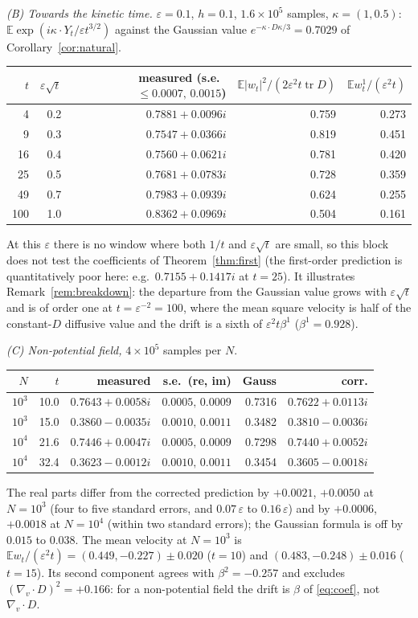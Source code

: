 \documentclass[11pt]{article}
\newcommand{\E}{\mathbb{E}}
\newcommand{\eps}{\varepsilon}
\newcommand{\tr}{\operatorname{tr}}
\theoremstyle{remark}
\begin{document}
\emph{(B) Towards the kinetic time.} $\eps=0.1$, $h=0.1$,
$1.6\times10^5$ samples, $\kappa = (1,0.5)$:
$\E\exp(i\kappa\cdot Y_t/\eps t^{3/2})$ against the Gaussian value
$e^{-\kappa\cdot D\kappa/3} = 0.7029$ of Corollary~\ref{cor:natural}.
\begin{center}
\small
\begin{tabular}{rrrrr}
  $t$ & $\eps\sqrt t$ & measured (s.e.\ $\le0.0007,\,0.0015$) &
  $\E|w_t|^2/(2\eps^2t\tr D)$ & $\E w^1_t/(\eps^2t)$ \\ \hline
  4 & 0.2 & $0.7881+0.0096i$ & 0.759 & 0.273 \\
  9 & 0.3 & $0.7547+0.0366i$ & 0.819 & 0.451 \\
  16 & 0.4 & $0.7560+0.0621i$ & 0.781 & 0.420 \\
  25 & 0.5 & $0.7681+0.0783i$ & 0.728 & 0.359 \\
  49 & 0.7 & $0.7983+0.0939i$ & 0.624 & 0.255 \\
  100 & 1.0 & $0.8362+0.0969i$ & 0.504 & 0.161 \\
\end{tabular}
\end{center}
At this $\eps$ there is no window where both $1/t$ and $\eps\sqrt t$ are
small, so this block does not test the coefficients of
Theorem~\ref{thm:first} (the first-order prediction is quantitatively poor
here: e.g.\ $0.7155+0.1417i$ at $t=25$). It illustrates
Remark~\ref{rem:breakdown}: the departure from the Gaussian value grows with
$\eps\sqrt t$ and is of order one at $t = \eps^{-2} = 100$, where the mean
square velocity is half of the constant-$D$ diffusive value and the drift is
a sixth of $\eps^2t\beta^1$ ($\beta^1 = 0.928$).

\emph{(C) Non-potential field,} $4\times10^5$ samples per $N$.
\begin{center}
\small
\begin{tabular}{rrrrrr}
  $N$ & $t$ & measured & s.e.\ (re, im) & Gauss & corr. \\ \hline
  $10^3$ & 10.0 & $0.7643+0.0058i$ & $0.0005,\,0.0009$ & 0.7316 & $0.7622+0.0113i$ \\
  $10^3$ & 15.0 & $0.3860-0.0035i$ & $0.0010,\,0.0011$ & 0.3482 & $0.3810-0.0036i$ \\
  $10^4$ & 21.6 & $0.7446+0.0047i$ & $0.0005,\,0.0009$ & 0.7298 & $0.7440+0.0052i$ \\
  $10^4$ & 32.4 & $0.3623-0.0012i$ & $0.0010,\,0.0011$ & 0.3454 & $0.3605-0.0018i$ \\
\end{tabular}
\end{center}
The real parts differ from the corrected prediction by $+0.0021$, $+0.0050$
at $N=10^3$ (four to five standard errors, and $0.07\,\eps$ to $0.16\,\eps$)
and by $+0.0006$, $+0.0018$ at $N=10^4$ (within two standard errors); the
Gaussian formula is off by $0.015$ to $0.038$.
The mean velocity at $N=10^3$ is $\E w_t/(\eps^2t) = (0.449,-0.227)\pm0.020$
($t=10$) and $(0.483,-0.248)\pm0.016$ ($t=15$). Its second component agrees
with $\beta^2 = -0.257$ and excludes $(\nabla_v\cdot D)^2 = +0.166$: for a
non-potential field the drift is $\beta$ of \eqref{eq:coef}, not
$\nabla_v\cdot D$.
\end{document}
